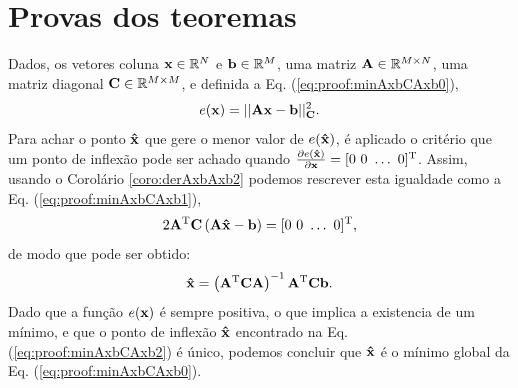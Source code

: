\section{Provas dos teoremas}
 
\begin{myproofT}\label{proof:theo:minAxbCAxb}
Dados,
os vetores coluna $\VECTOR{x}\in \mathbb{R}^N$ e $\VECTOR{b}\in \mathbb{R}^M$,  
uma matriz $\MATRIX{A} \in \mathbb{R}^{M\times N}$, 
uma matriz diagonal $\MATRIX{C} \in \mathbb{R}^{M\times M}$, e 
definida a Eq. (\ref{eq:proof:minAxbCAxb0}),
\begin{equation}\label{eq:proof:minAxbCAxb0}
e(\VECTOR{x})=||\MATRIX{A}\VECTOR{x}-\VECTOR{b}||_{\MATRIX{C}}^2.
\end{equation}
Para achar o ponto $\VECTOR{\hat{x}}$ que gere o menor valor de $e(\VECTOR{\hat{x}})$, é aplicado
o critério que um ponto de inflexão pode ser achado quando 
$\frac{\partial e(\VECTOR{\hat{x}})}{\partial \VECTOR{x} }=[0~ 0~ \hdots~ 0 ]^{\transpose}$.
Assim, usando o Corolário \ref{coro:derAxbAxb2} podemos 
rescrever esta igualdade como a Eq. (\ref{eq:proof:minAxbCAxb1}),
\begin{equation}\label{eq:proof:minAxbCAxb1}
2 \MATRIX{A}^{\transpose}\MATRIX{C}\left(\MATRIX{A}\VECTOR{\hat{x}}-\VECTOR{b}\right)=[0~ 0~ \hdots~ 0 ]^{\transpose},
\end{equation}
de modo que pode ser obtido:
\begin{equation}\label{eq:proof:minAxbCAxb2}
\VECTOR{\hat{x}}=\left( \MATRIX{A}^{\transpose}\MATRIX{C}\MATRIX{A} \right)^{-1} \MATRIX{A}^{\transpose}\MATRIX{C} \VECTOR{b}.
\end{equation}
Dado que  a função $e(\VECTOR{x})$ é sempre positiva, o que implica a existencia de um mínimo,
e que o ponto de inflexão $\VECTOR{\hat{x}}$ encontrado na Eq. (\ref{eq:proof:minAxbCAxb2}) é único, 
podemos concluir que  $\VECTOR{\hat{x}}$ é o mínimo global da Eq. (\ref{eq:proof:minAxbCAxb0}).
\end{myproofT}

